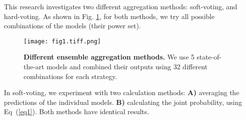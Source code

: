 \documentclass[10pt,letterpaper]{article}
\newif\ifhighlight
\newcommand{\hlb}[1]{\ifhighlight{\hl{#1}}\else{#1}\fi}
\begin{document}
\begin{table}[!ht]
\begin{adjustwidth}{-1.0in}{0in} %
  \centering
  \caption{
    {\bf The r@\hlb{$k$} metrics for the networks used to construct the  ensemble model.}}
  \label{table4}
  \end{adjustwidth}
\end{table}

This research investigates two different aggregation methods: soft-voting, and hard-voting. As shown in \hlb{Fig.} \ref{fig1}, for both methods, we try all possible  combinations of the models (their power set).

\begin{figure}[!ht]
\caption{{\bf Different ensemble aggregation methods.} We use 5 state-of-the-art models and combined their outputs using 32 different combinations for each strategy. }
\texttt{[image: fig1.tiff.png]}
\label{fig1}
\end{figure}

In soft-voting, we experiment with two calculation methods: {\bf A)} averaging the predictions of the individual models. {\bf B)} calculating the joint probability, using Eq~(\ref{eq1}). Both methods have identical results.
\end{document}
